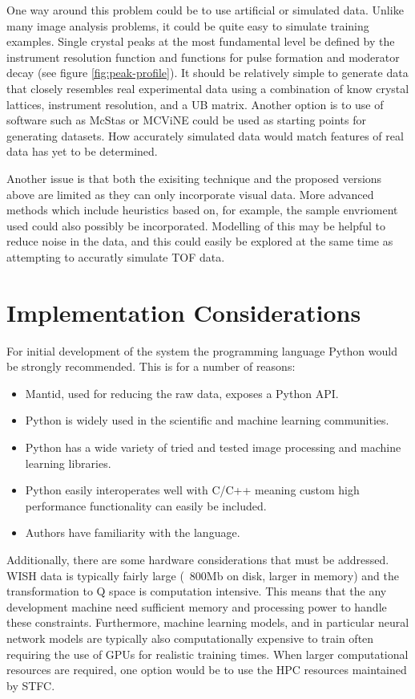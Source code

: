 \documentclass[paper=a4, fontsize=8pt]{scrartcl} \usepackage[T1]{fontenc}
\begin{document}
One way around this problem could be to use artificial or simulated data. Unlike 
many image analysis problems, it could be quite easy to simulate training
examples. Single crystal peaks at the most fundamental level be defined by the
instrument resolution function and functions for pulse formation and moderator
decay (see figure \ref{fig:peak-profile}). It should be relatively simple to 
generate data that closely resembles real experimental data using a combination of
know crystal lattices, instrument resolution, and a UB matrix. Another option is 
to use of software such as McStas 
\cite{McStas} or MCViNE \cite{MCViNE} could be used as starting points for 
generating datasets. How accurately simulated data would match features of real 
data has yet to be determined.

Another issue is that both the exisiting technique and the proposed versions above are 
limited as they can only incorporate visual data. More advanced 
methods which include heuristics based on, for example, the sample envrioment used could also 
possibly be incorporated. Modelling of this may be helpful to reduce
noise in the data, and this could easily be explored at the same time as attempting
to accuratly simulate TOF data.

\section{Implementation Considerations}
For initial development of the system the programming language Python would be
strongly recommended. This is for a number of reasons:

\begin{itemize}
\item Mantid, used for reducing the raw data, exposes a Python API.
\item Python is widely used in the scientific and machine learning communities.
\item Python has a wide variety of tried and tested image processing 
\cite{scikit-image} and machine learning \cite{scikit-learn} \cite{keras} 
libraries.
\item Python easily interoperates well with C/C++ meaning custom high 
performance functionality can easily be included.
\item Authors have familiarity with the language.
\end{itemize}

Additionally, there are some hardware considerations that must be addressed. 
WISH data is typically fairly large (~800Mb on disk, larger in memory) and the
transformation to Q space is computation intensive. This means that the any 
development machine need sufficient memory and processing power to handle these 
constraints. Furthermore, machine learning models, and in particular neural network models are typically also 
computationally expensive to train often requiring the use of GPUs for realistic 
training times. When larger computational resources are required, one option would be
to use the HPC resources maintained by STFC.
\end{document}
